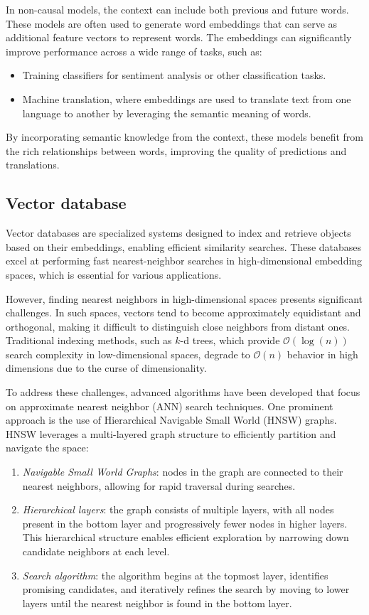 In non-causal models, the context can include both previous and future words. 
These models are often used to generate word embeddings that can serve as additional feature vectors to represent words.
The embeddings can significantly improve performance across a wide range of tasks, such as:
\begin{itemize}
    \item Training classifiers for sentiment analysis or other classification tasks.
    \item Machine translation, where embeddings are used to translate text from one language to another by leveraging the semantic meaning of words.
\end{itemize}
\noindent By incorporating semantic knowledge from the context, these models benefit from the rich relationships between words, improving the quality of predictions and translations.

\subsection{Vector database}
Vector databases are specialized systems designed to index and retrieve objects based on their embeddings, enabling efficient similarity searches. 
These databases excel at performing fast nearest-neighbor searches in high-dimensional embedding spaces, which is essential for various applications.

However, finding nearest neighbors in high-dimensional spaces presents significant challenges. In such spaces, vectors tend to become approximately equidistant and orthogonal, making it difficult to distinguish close neighbors from distant ones. 
Traditional indexing methods, such as $k$-d trees, which provide $\mathcal{O}(\log(n))$ search complexity in low-dimensional spaces, degrade to $\mathcal{O}(n)$ behavior in high dimensions due to the curse of dimensionality.

To address these challenges, advanced algorithms have been developed that focus on approximate nearest neighbor (ANN) search techniques. 
One prominent approach is the use of Hierarchical Navigable Small World (HNSW) graphs. 
HNSW leverages a multi-layered graph structure to efficiently partition and navigate the space:
\begin{enumerate}
    \item \textit{Navigable Small World Graphs}: nodes in the graph are connected to their nearest neighbors, allowing for rapid traversal during searches.
    \item \textit{Hierarchical layers}: the graph consists of multiple layers, with all nodes present in the bottom layer and progressively fewer nodes in higher layers. 
        This hierarchical structure enables efficient exploration by narrowing down candidate neighbors at each level.
    \item \textit{Search algorithm}: the algorithm begins at the topmost layer, identifies promising candidates, and iteratively refines the search by moving to lower layers until the nearest neighbor is found in the bottom layer.
\end{enumerate}
